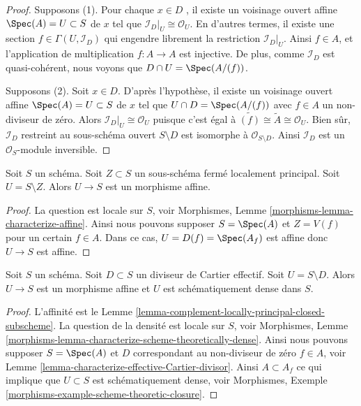 \begin{proof}
Supposons (1). Pour chaque  $x \in D$ , il existe un voisinage ouvert affine
 $\Spec(A) = U \subset S$  de  $x$  tel que  $\mathcal{I}_D|_U \cong \mathcal{O}_U$. En d'autres termes, il existe
une section  $f \in \Gamma(U, \mathcal{I}_D)$  qui engendre librement la restriction  $\mathcal{I}_D|_U$. Ainsi
 $f \in A$, et l'application de multiplication  $f : A \to A$  est injective. De
plus, comme  $\mathcal{I}_D$  est quasi-cohérent, nous voyons que  $D \cap U = \Spec(A/(f))$.

\medskip\noindent
Supposons (2). Soit  $x \in D$. D'après l'hypothèse, il existe un voisinage
ouvert affine  $\Spec(A) = U \subset S$  de  $x$  tel que  $U \cap D = \Spec(A/(f))$  avec  $f \in A$ 
un non-diviseur de zéro. Alors  $\mathcal{I}_D|_U \cong \mathcal{O}_U$  puisque c'est égal à  $\widetilde{(f)} \cong \widetilde{A} \cong \mathcal{O}_U$.
Bien sûr,  $\mathcal{I}_D$  restreint au sous-schéma ouvert  $S \setminus D$  est isomorphe
à  $\mathcal{O}_{S \setminus D}$. Ainsi  $\mathcal{I}_D$  est un  $\mathcal{O}_S$-module inversible.
\end{proof}

\begin{lemma}
\label{lemma-complement-locally-principal-closed-subscheme}
Soit  $S$  un schéma. Soit  $Z \subset S$  un sous-schéma fermé localement
principal. Soit  $U = S \setminus Z$. Alors  $U \to S$  est un morphisme affine.
\end{lemma}

\begin{proof}
La question est locale sur  $S$, voir Morphismes, Lemme  \ref{morphisms-lemma-characterize-affine}.
Ainsi nous pouvons supposer  $S = \Spec(A)$  et  $Z = V(f)$  pour un certain
 $f \in A$. Dans ce cas,  $U = D(f) = \Spec(A_f)$  est affine donc  $U \to S$  est affine.
\end{proof}

\begin{lemma}
\label{lemma-complement-effective-Cartier-divisor}
Soit  $S$  un schéma. Soit  $D \subset S$  un diviseur de Cartier effectif.
Soit  $U = S \setminus D$. Alors  $U \to S$  est un morphisme affine et  $U$  est
schématiquement dense dans  $S$.
\end{lemma}

\begin{proof}
L'affinité est le Lemme  \ref{lemma-complement-locally-principal-closed-subscheme}. La question de la densité est locale sur
 $S$, voir Morphismes, Lemme  \ref{morphisms-lemma-characterize-scheme-theoretically-dense}. Ainsi nous pouvons supposer
 $S = \Spec(A)$  et  $D$  correspondant au non-diviseur de zéro  $f \in A$,
voir Lemme  \ref{lemma-characterize-effective-Cartier-divisor}. Ainsi  $A \subset A_f$  ce qui implique que  $U \subset S$  est
schématiquement dense, voir Morphismes, Exemple  \ref{morphisms-example-scheme-theoretic-closure}.
\end{proof}

